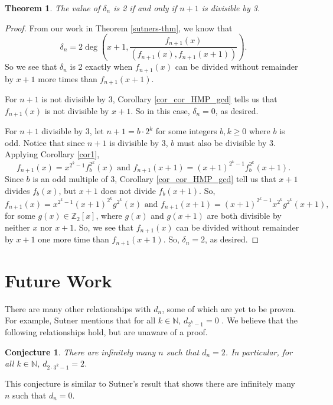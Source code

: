 \documentclass[a4paper]{article}
\newtheorem{theorem}{Theorem}[section]
\newtheorem{conjecture}{Conjecture}
\newcommand{\Z}{\mathbb{Z}}
\newcommand{\N}{\mathbb{N}}
\begin{document}
	\begin{theorem}\label{when-is-deltan-2}
		The value of $\delta_n$ is 2 if and only if $n+1$ is divisible by 3.
	\end{theorem}
	\begin{proof}
		From our work in Theorem \ref{sutners-thm}, we know that
		\begin{equation*}
			\delta_n = 2\deg\left(x+1,\frac{f_{n+1}(x)}{(f_{n+1}(x),f_{n+1}(x+1))}\right).
		\end{equation*}
		So we see that $\delta_n$ is 2 exactly when $f_{n+1}(x)$ can be divided without remainder by $x+1$ more times than $f_{n+1}(x+1)$.
		
		For $n+1$ is not divisible by 3, Corollary \ref{cor_cor_HMP_gcd} tells us that $f_{n+1}(x)$ is not divisible by $x+1$.
		So in this case, $\delta_n = 0$, as desired.
		
		For $n+1$ divisible by 3, let $n+1 = b \cdot 2^k$ for some integers $b, k \geq 0$ where $b$ is odd.
		Notice that since $n+1$ is divisible by 3, $b$ must also be divisible by 3.
		Applying Corollary \ref{cor1},
		\begin{equation*}
			f_{n+1}(x) = x^{2^k - 1}f_{b}^{2^k}(x) \text{ and } f_{n+1}(x+1) = (x+1)^{2^k - 1}f_{b}^{2^k}(x+1).
		\end{equation*}
		Since $b$ is an odd multiple of 3, Corollary \ref{cor_cor_HMP_gcd} tell us that $x+1$ divides $f_b(x)$, but $x+1$ does not divide $f_b(x+1)$.
		So,
		\begin{equation*}
			f_{n+1}(x) = x^{2^k - 1}(x+1)^{2^k}g^{2^k}(x) \text{ and } f_{n+1}(x+1) = (x+1)^{2^k - 1}x^{2^k}g^{2^k}(x+1),
		\end{equation*} 
		for some $g(x) \in \Z_2[x]$, where $g(x)$ and $g(x+1)$ are both divisible by neither $x$ nor $x+1$.
		So, we see that $f_{n+1}(x)$ can be divided without remainder by $x+1$ one more time than $f_{n+1}(x+1)$.
		So, $\delta_n = 2$, as desired.
	\end{proof}

	\section{Future Work}
	There are many other relationships with $d_n$, some of which are yet to be proven.
	For example, Sutner mentions that for all $k \in \N$, $d_{2^k - 1} = 0$ \cite{Sutner1989}.
	We believe that the following relationships hold, but are unaware of a proof.
	
	\begin{conjecture}\label{conj-all-2}
		There are infinitely many $n$ such that $d_n = 2$.
		In particular, for all $k \in \N$, $d_{2\cdot 3^{k} - 1} = 2$.
	\end{conjecture}
	This conjecture is similar to Sutner's result that shows there are infinitely many $n$ such that $d_n = 0$.
	
\end{document}
